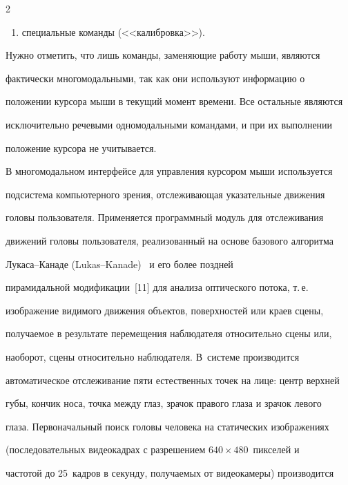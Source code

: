 \begin{multicols}{2}
\begin{enumerate}[(1)]
(например, <<открыть>>, <<сохранить>>, <<печать>>, <<пуск>> и~т.\,д.); 


\item специальные команды (<<калибровка>>). 


\end{enumerate}


  


  Нужно отметить, что лишь команды, заменяющие работу мыши, являются 


фактически многомодальными, так как они используют информацию о 


положении курсора мыши в текущий момент времени. Все остальные являются 


исключительно речевыми одномодальными командами, и при их выполнении 


положение курсора не учитывается.


  


  В многомодальном интерфейсе для управления курсором мыши используется 


подсистема компьютер\-ного зрения, отслеживающая указательные движения 


головы пользователя. Применяется программный модуль для отслеживания 


движений головы пользователя, реализованный на основе базового алгоритма 


Лукаса--Канаде (Lukas--Kanade)~\cite{10kar} и его более поздней 


пирамидальной модификации~[11] для анализа оптического потока, т.\,е.\ 


изображение видимого движения объектов, поверхностей или краев сцены, 


получаемое в результате перемещения наблюдателя относительно сцены или, 


наоборот, сцены относительно наблюдателя. В~системе производится 


автоматическое отслеживание пяти естественных точек на лице: центр верхней 


губы, кончик носа, точка между глаз, зрачок правого глаза и зрачок левого 


глаза. Первоначальный поиск головы человека на статических изображениях 


(последовательных ви\-део\-кад\-рах с разрешением $640\times480$~пикселей и 


частотой до 25~кадров в секунду, получаемых от видеокамеры) производится 



\end{multicols}
